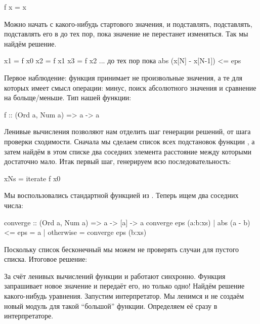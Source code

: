 \begin{code}
f x = x
\end{code}

Можно начать с какого-нибудь стартового значения, и подставлять,
подставлять, подставлять его в  до тех пор, пока значение не
перестанет изменяться. Так мы найдём решение.


\begin{code}
x1 = f x0
x2 = f x1
x3 = f x2
...
до тех пор пока abs (x[N] - x[N-1]) <= eps
\end{code}

Первое наблюдение: функция принимает не произвольные значения, а те для
которых имеет смысл операции: минус, поиск абсолютного значения и
сравнение на больще/меньше. Тип нашей функции:


\begin{code}
f :: (Ord a, Num a) => a -> a
\end{code}

Ленивые вычисления позволяют нам отделить шаг генерации решений, от шага
проверки сходимости. Сначала мы сделаем список всех подстановок функции
, а затем найдём в этом списке два соседних элемента расстояние
между которыми достаточно мало. Итак первый шаг, генерируем всю
последовательность:


\begin{code}
xNs = iterate f x0
\end{code}

Мы воспользовались стандартной функцией  из .
Теперь ищем два соседних числа:


\begin{code}
converge :: (Ord a, Num a) => a -> [a] -> a
converge eps (a:b:xs) 
    | abs (a - b) <= eps    = a
    | otherwise             = converge eps (b:xs)
\end{code}

Поскольку список бесконечный мы можем не проверять случаи для пустого
списка. Итоговое решение:



За счёт ленивых вычислений функции  и  работают
синхронно. Функция  запрашивает новое значение и
 передаёт его, но только одно! Найдём решение какого-нибудь
уравнения. Запустим интерпретатор. Мы ленимся и не создаём новый модуль
для такой ``большой'' функции. Определяем её сразу в интерпретаторе.


